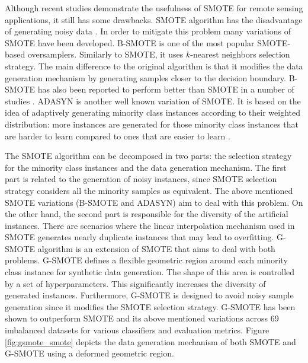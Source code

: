 \documentclass[remotesensing,article,submit,moreauthors,pdftex]{Definitions/mdpi}
\begin{document}
Although recent studies demonstrate the usefulness of SMOTE for remote sensing
applications, it still has some drawbacks. SMOTE algorithm has the disadvantage
of generating noisy data \cite{Douzas2017}. In order to mitigate this problem
many variations of SMOTE have been developed. B-SMOTE is one of the most popular
SMOTE-based oversamplers. Similarly to SMOTE, it uses $k$-nearest neighbors
selection strategy. The main difference to the original algorithm is that it
modifies the data generation mechanism by generating samples closer to the
decision boundary. B-SMOTE has also been reported to perform better than SMOTE
in a number of studies \cite{Nguyen2009, Ramentol2012}. ADASYN is another well
known variation of SMOTE. It is based on the idea of adaptively generating
minority class instances according to their weighted distribution: more
instances are generated for those minority class instances that are harder to
learn compared to ones that are easier to learn \cite{HaiboHe2008}.

The SMOTE algorithm can be decomposed in two parts: the selection strategy for
the minority class instances and the data generation mechanism. The first part
is related to the generation of noisy instances, since SMOTE selection strategy
considers all the minority samples as equivalent. The above mentioned SMOTE
variations (B-SMOTE and ADASYN) aim to deal with this problem. On the other
hand, the second part is responsible for the diversity of the artificial
instances. There are scenarios where the linear interpolation mechanism used in
SMOTE generates nearly duplicate instances that may lead to overfitting. G-SMOTE
algorithm is an extension of SMOTE that aims to deal with both problems. G-SMOTE
defines a flexible geometric region around each minority class instance for
synthetic data generation. The shape of this area is controlled by a set of
hyperparameters. This significantly increases the diversity of generated
instances. Furthermore, G-SMOTE is designed to avoid noisy sample generation
since it modifies the SMOTE selection strategy. G-SMOTE has been shown to
outperform SMOTE and its above  mentioned variations across 69 imbalanced
datasets for various classifiers and evaluation metrics. Figure
\ref{fig:gsmote_smote} depicts the data generation mechanism of both SMOTE and
G-SMOTE using a deformed geometric region.
\end{document}

